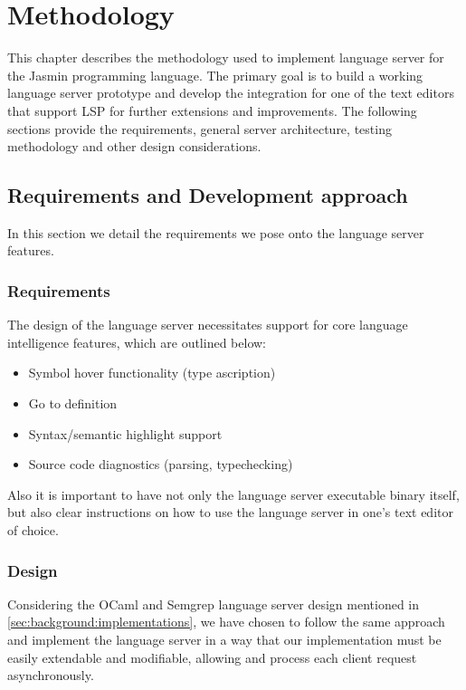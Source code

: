 \chapter{Methodology}
\label{chap:met}

This chapter describes the methodology used to implement language server for the
Jasmin programming language. The primary goal is to build a working language
server prototype and develop the integration for one of the text editors that
support LSP for further extensions and improvements. The following sections
provide the requirements, general server architecture, testing methodology
and other design considerations.

\section{Requirements and Development approach}

In this section we detail the requirements we pose onto the language server
features.

\subsection{Requirements}
\label{chap:met:requierements}

The design of the language server necessitates support for core language
intelligence features, which are outlined below:

\begin{itemize}
  \item Symbol hover functionality (type ascription)
  \item Go to definition
  \item Syntax/semantic highlight support
  \item Source code diagnostics (parsing, typechecking)
\end{itemize}

Also it is important to have not only the language server executable binary
itself, but also clear instructions on how to use the language server in one's
text editor of choice.

\subsection{Design}

Considering the OCaml and Semgrep language server design mentioned in
\ref{sec:background:implementations}, we have chosen to follow the same approach
and implement the language server in a way that our implementation must be
easily extendable and modifiable, allowing  and process each client request
asynchronously.

